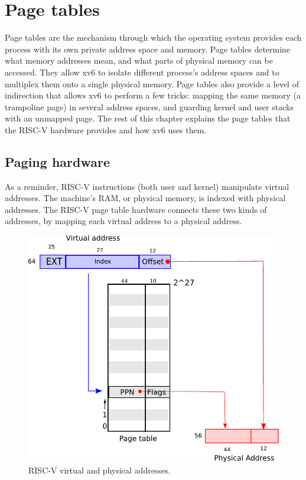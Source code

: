 \chapter{Page tables}
\label{CH:MEM}

Page tables are the mechanism through which the operating system
provides each process with its own private address space and memory.
Page tables determine what memory addresses mean, and what parts of
physical memory can be accessed. They allow xv6 to isolate different
process's address spaces and to multiplex them onto a single physical
memory. Page tables also provide a level of indirection that allows xv6 to
perform a few tricks: mapping the same memory (a trampoline page) in
several address spaces, and guarding kernel and user stacks with an
unmapped page. The rest of this chapter explains the page tables that
the RISC-V hardware provides and how xv6 uses them.

\section{Paging hardware}
As a reminder,
RISC-V instructions (both user and kernel) manipulate virtual addresses.
The machine's RAM, or physical memory, is indexed with physical
addresses.
The RISC-V page table hardware connects these two kinds of addresses,
by mapping each virtual address to a physical address.

\begin{figure}[t]
\center
\includegraphics[scale=0.5]{fig/riscv_address.pdf}
\caption{RISC-V virtual and physical addresses.}
\label{fig:riscv_address}
\end{figure}

